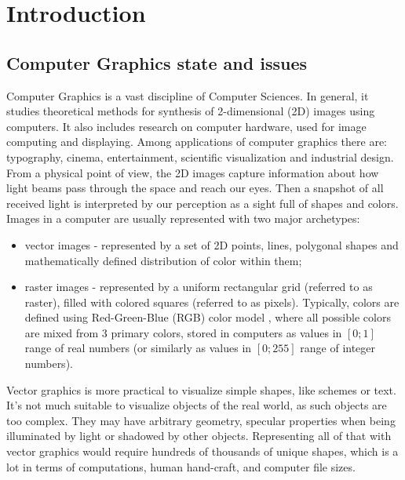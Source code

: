 \chapter{Introduction}\label{chapter:intro}

\section{Computer Graphics state and issues}\label{intro:cg}

Computer Graphics is a vast discipline of Computer Sciences. In general, it studies theoretical methods for synthesis of 2-dimensional (2D) images using computers. It also includes research on computer hardware, used for image computing and displaying. Among applications of computer graphics there are: typography, cinema, entertainment, scientific visualization and industrial design. From a physical point of view, the 2D images capture information about how light beams pass through the space and reach our eyes. Then a snapshot of all received light is interpreted by our perception as a sight full of shapes and colors. Images in a computer are usually represented with two major archetypes:

\begin{itemize}
	\item vector images \cite{aux:vector14} - represented by a set of 2D points, lines, polygonal shapes and mathematically defined distribution of color within them;
	\item raster images \cite{aux:raster94} - represented by a uniform rectangular grid (referred to as raster), filled with colored squares (referred to as pixels). Typically, colors are defined using Red-Green-Blue (RGB) color model \cite{aux:color05}, where all possible colors are mixed from 3 primary colors, stored in computers as values in $[0;1]$ range of real numbers (or similarly as values in $[0;255]$ range of integer numbers).
\end{itemize}

Vector graphics is more practical to visualize simple shapes, like schemes or text. It's not much suitable to visualize objects of the real world, as such objects are too complex. They may have arbitrary geometry, specular properties when being illuminated by light or shadowed by other objects. Representing all of that with vector graphics would require hundreds of thousands of unique shapes, which is a lot in terms of computations, human hand-craft, and computer file sizes. 


